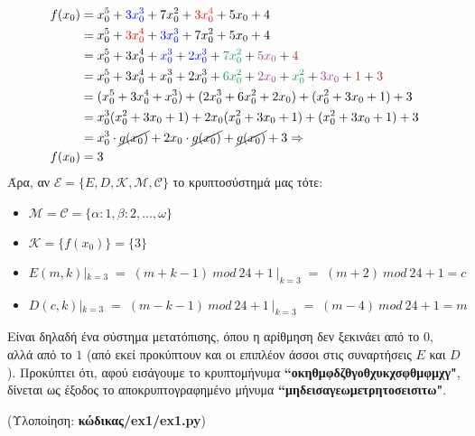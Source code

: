 \documentclass[12pt]{article}
\newcommand{\lt}{\latintext}
\begin{document}
\begin{align*}
	f(x_{0}) &= x_{0}^{5} + {\color{blue} 3x_{0}^{3}} + 7x_{0}^{2} + 
	{\color{red}3x_{0}^{4}} + 5x_{0} + 4 \\
	&= x_{0}^{5} + {\color{red}3x_{0}^{4}} + {\color{blue} 3x_{0}^{3}} + 7x_{0}^{2} + 5x_{0} + 4 \\
	&= x_{0}^{5} + 3x_{0}^{4} + {\color{blue} x_{0}^{3}} + {\color{blue} 2x_{0}^{3}} 
	+ {\color{ForestGreen} 7x_{0}^{2}} + {\color{DarkOrchid} 5x_{0}} + {\color{Mahogany}4} \\
	&= x_{0}^{5} + 3x_{0}^{4} + x_{0}^{3} + 2x_{0}^{3} +
	{\color{ForestGreen} 6x_{0}^{2}} + {\color{DarkOrchid} 2x_{0}} + 
	{\color{ForestGreen} x_{0}^{2}} + {\color{DarkOrchid} 3x_{0}} + {\color{Mahogany}1} + 
	{\color{Mahogany}3} \\
	&= (x_{0}^{5} + 3x_{0}^{4} + x_{0}^{3}) + (2x_{0}^{3} +
	6x_{0}^{2} + 2x_{0}) + (x_{0}^{2} + 3x_{0} + 1) + 3 \\
	&= x_{0}^{3}(x_{0}^{2} + 3x_{0} + 1) + 2x_{0}(x_{0}^{2} +
	3x_{0} + 1) + (x_{0}^{2} + 3x_{0} + 1) + 3 \\
	&= x_{0}^{3}\cdot \cancel{g(x_{0})} + 2x_{0}\cdot \cancel{g(x_{0})} + \cancel{g(x_{0})} + 3
	\Rightarrow \\
	f(x_{0}) &= 3
\end{align*}
\noindent
Άρα, αν $\mathcal{E} = \{E, D, \mathcal{K}, \mathcal{M}, \mathcal{C}\}$ το κρυπτοσύστημά μας τότε:
\begin{itemize}
	\item $\mathcal{M} = \mathcal{C} = \{\alpha:1, \beta:2, ..., \omega\}$
	\item $\mathcal{K} = \{f(x_{0})\} = \{3\}$
	\item $E(m, k)|_{k=3}\; =\; (m + k - 1)\:mod\:24 + 1\:|_{k=3}\; = \;(m + 2)\:mod\:24 + 1 = c$
	\item $D(c, k)|_{k=3}\; =\; (m - k - 1)\:mod\:24 + 1\:|_{k=3}\; = \;(m - 4)\:mod\:24 + 1 = m$
\end{itemize}
Είναι δηλαδή ένα σύστημα μετατόπισης, όπου η αρίθμηση δεν ξεκινάει από το $0$, αλλά από το $1$
(από εκεί προκύπτουν και οι επιπλέον άσσοι στις συναρτήσεις $E$ και $D$).
Προκύπτει ότι, αφού εισάγουμε το κρυπτομήνυμα \textbf{{\lt ``}οκηθμφδζθγοθχυκχσφθμφμχγ{\lt "}}, 
δίνεται ως έξοδος το αποκρυπτογραφημένο μήνυμα \textbf{{\lt ``}μηδεισαγεωμετρητοσεισιτω{\lt "}}.\\ 

\vspace{0.1in}

\noindent
(Υλοποίηση: \textbf{κώδικας/{\lt ex1/ex1.py}})
\end{document}

